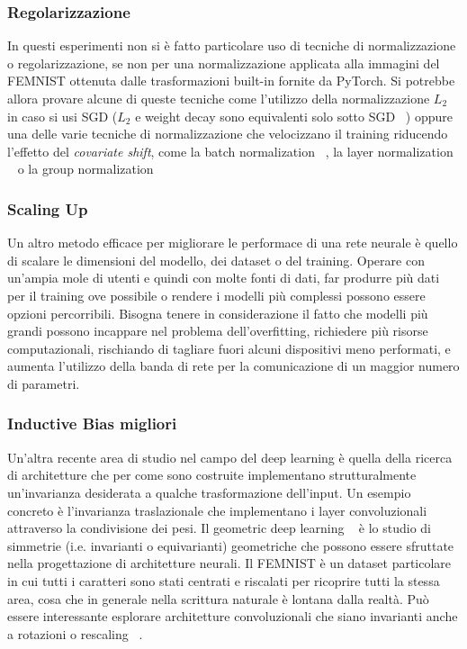 \subsubsection{Regolarizzazione}
In questi esperimenti non si è fatto particolare uso di tecniche di 
normalizzazione o regolarizzazione, se non per una normalizzazione 
applicata alla immagini del FEMNIST ottenuta dalle trasformazioni 
built-in fornite da PyTorch. Si potrebbe allora provare alcune di 
queste tecniche come l'utilizzo della normalizzazione \(L_2\) in caso si 
usi SGD (\(L_2\) e weight decay sono equivalenti solo sotto SGD 
~\cite{Loshchilov2017AdamW}) oppure una delle varie tecniche di 
normalizzazione che velocizzano il training riducendo l'effetto del 
\textit{covariate shift}, come la batch normalization ~\cite{ioffe2015batch},
la layer normalization ~\cite{ba2016layer} o la group normalization 
~\cite{wu2018group}


\subsubsection{Scaling Up}
Un altro metodo efficace per migliorare le performace di una rete neurale 
è quello di scalare le dimensioni del modello, dei dataset o del training.
Operare con un'ampia mole di utenti e quindi con molte fonti di dati,
far produrre più dati per il training ove possibile o rendere i modelli 
più complessi possono essere opzioni percorribili. Bisogna tenere in 
considerazione il fatto che modelli più grandi possono incappare nel 
problema dell'overfitting, richiedere più risorse computazionali, 
rischiando di tagliare fuori alcuni dispositivi meno performati, e 
aumenta l'utilizzo della banda di rete per la comunicazione di un 
maggior numero di parametri.


\subsubsection{Inductive Bias migliori}
Un'altra recente area di studio nel campo del deep learning è quella 
della ricerca di architetture che per come sono costruite implementano
strutturalmente un'invarianza desiderata a qualche trasformazione 
dell'input. Un esempio concreto è l'invarianza traslazionale che 
implementano i layer convoluzionali attraverso la condivisione dei pesi.
Il geometric deep learning ~\cite{bronstein2021geometric} è lo studio di simmetrie 
(i.e. invarianti o equivarianti) geometriche che possono essere sfruttate nella 
progettazione di architetture neurali.
Il FEMNIST è un dataset particolare in cui tutti i caratteri sono stati
centrati e riscalati per ricoprire tutti la stessa area, cosa che in 
generale nella scrittura naturale è lontana dalla realtà. Può essere 
interessante esplorare architetture convoluzionali che siano invarianti 
anche a rotazioni o rescaling ~\cite{sosnovik2023symmetry, cohen2016group,
marcos2016rotation, cohen2016steer}.


